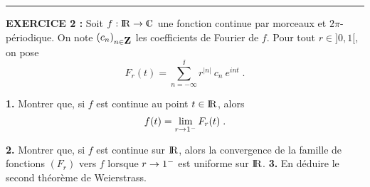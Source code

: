 \documentclass{article}
\begin{document}
\bsk
\hrule
\bsk

{\bf EXERCICE 2 :}\msk
Soit $f:\rmat\vers\cmat$ une fonction continue par morceaux et $2\pi$-p\'eriodique. On note $(c_n)_{n\in\zmat}$ les coefficients de Fourier de $f$. Pour tout $r\in]0,1[$, on pose\vv
$$F_r(t)=\sum_{n=-\infty}^{\ii}r^{|n|}\>c_n\>e^{int}\;.$$
\par
{\bf 1.} Montrer que, si $f$ est continue au point $t\in{\rm I\kern-0.6mm R}$, alors\vv
$$f(t)=\lim_{r\rightarrow1^-}F_r(t)\;.$$ 
\par
{\bf 2.} Montrer que, si $f$ est continue sur ${\rm I\kern-0.6mm R}$, alors la convergence de la famille de fonctions $(F_r)$ vers $f$ lorsque $r\rightarrow 1^-$ est uniforme sur ${\rm I\kern-0.6mm R}$.
\msk
{\bf 3.} En d\'eduire le second th\'eor\`eme de Weierstrass.


\msk
\cl{- - - - - - - - - - - - - - - - - - - - - - - - - - - - - -}
\msk
\end{document}
